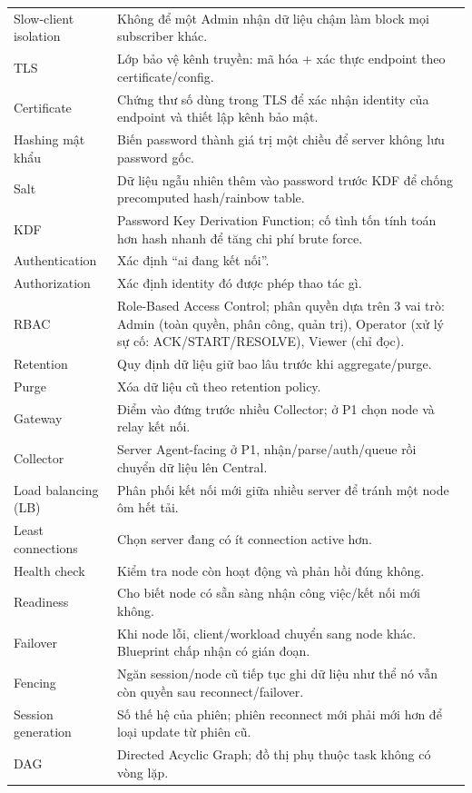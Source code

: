 \begin{longtable}{p{3.4cm} p{11.2cm}}
Slow-client isolation & Không để một Admin nhận dữ liệu chậm làm block mọi subscriber khác. \\
TLS & Lớp bảo vệ kênh truyền: mã hóa + xác thực endpoint theo certificate/config. \\
Certificate & Chứng thư số dùng trong TLS để xác nhận identity của endpoint và thiết lập kênh bảo mật. \\
Hashing mật khẩu & Biến password thành giá trị một chiều để server không lưu password gốc. \\
Salt & Dữ liệu ngẫu nhiên thêm vào password trước KDF để chống precomputed hash/rainbow table. \\
KDF & Password Key Derivation Function; cố tình tốn tính toán hơn hash nhanh để tăng chi phí brute force. \\
Authentication & Xác định ``ai đang kết nối''. \\
Authorization & Xác định identity đó được phép thao tác gì. \\
RBAC & Role-Based Access Control; phân quyền dựa trên 3 vai trò: Admin (toàn quyền, phân công, quản trị), Operator (xử lý sự cố: ACK/START/RESOLVE), Viewer (chỉ đọc). \\
Retention & Quy định dữ liệu giữ bao lâu trước khi aggregate/purge. \\
Purge & Xóa dữ liệu cũ theo retention policy. \\
Gateway & Điểm vào đứng trước nhiều Collector; ở P1 chọn node và relay kết nối. \\
Collector & Server Agent-facing ở P1, nhận/parse/auth/queue rồi chuyển dữ liệu lên Central. \\
Load balancing (LB) & Phân phối kết nối mới giữa nhiều server để tránh một node ôm hết tải. \\
Least connections & Chọn server đang có ít connection active hơn. \\
Health check & Kiểm tra node còn hoạt động và phản hồi đúng không. \\
Readiness & Cho biết node có sẵn sàng nhận công việc/kết nối mới không. \\
Failover & Khi node lỗi, client/workload chuyển sang node khác. Blueprint chấp nhận có gián đoạn. \\
Fencing & Ngăn session/node cũ tiếp tục ghi dữ liệu như thể nó vẫn còn quyền sau reconnect/failover. \\
Session generation & Số thế hệ của phiên; phiên reconnect mới phải mới hơn để loại update từ phiên cũ. \\
DAG & Directed Acyclic Graph; đồ thị phụ thuộc task không có vòng lặp. \\

\end{longtable}

